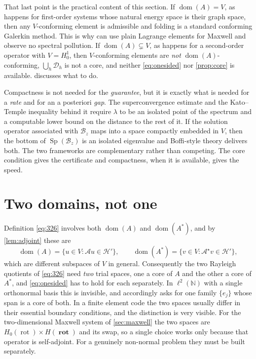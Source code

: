 \documentclass[11pt,a4paper]{article}
\theoremstyle{plain}
\newcommand{\N}{\mathbb{N}}
\newcommand{\Hb}{\mathcal{H}}
\newcommand{\Vb}{V}
\newcommand{\Aop}{\mathcal{A}}
\newcommand{\Bop}{\mathcal{B}}
\newcommand{\Dop}{\mathcal{D}}
\DeclareMathOperator{\dom}{dom}
\DeclareMathOperator{\Sp}{Sp}
\DeclareMathOperator{\rot}{rot}
\DeclareMathOperator{\Rot}{\mathbf{rot}}
\newcommand{\adj}{\star}                 %
\begin{document}
That last point is the practical content of this section.  If $\dom(A) = \Vb$,
as happens for first-order systems whose natural energy space is their graph
space, then any $\Vb$-conforming element is admissible and folding is a standard
conforming Galerkin method.  This is why \cite[\S3.4.4]{Colbrook2026} can use
plain Lagrange elements for Maxwell and observe no spectral pollution.  If
$\dom(A) \subsetneq \Vb$, as happens for a second-order operator with $\Vb =
H^1_0$, then $\Vb$-conforming elements are \emph{not} $\dom(A)$-conforming,
$\bigcup_h \Dop_h$ is not a core, and neither \cref{eq:onesided} nor
\cref{prop:core} is available.   discusses what to do.

\begin{remark}
  \label{rem:whereboffi}
  Compactness is not needed for the \emph{guarantee}, but it is exactly what is
  needed for a \emph{rate} and for an a posteriori \emph{gap}.  The
  superconvergence estimate \cite[Proposition~3.3.12, p.~107]{Colbrook2026} and
  the Kato--Temple inequality \cite[Theorem~3.3.11]{Colbrook2026} behind it
  require $\lambda$ to be an isolated point of the spectrum and a computable
  lower bound on the distance to the rest of it.  If the solution operator
  associated with $\Bop_z$ maps into a space compactly embedded in $\Vb$, then
  the bottom of $\Sp(\Bop_z)$ is an isolated eigenvalue and Boffi-style theory
  \cite{Boffi2010,BoffiBrezziFortin2013} delivers both.  The two frameworks are
  complementary rather than competing.  The core condition gives the certificate
  and compactness, when it is available, gives the speed.
\end{remark}

\section{Two domains, not one}
\label{sec:twodomains}

Definition \cref{eq:326} involves both $\dom(A)$ and $\dom(A^*)$, and by
\cref{lem:adjoint} these are
\begin{equation}
  \label{eq:twodomains}
  \dom(A) = \{u \in \Vb : \Aop u \in \Hb'\},
  \qquad
  \dom(A^*) = \{v \in \Vb : \Aop^{\adj} v \in \Hb'\},
\end{equation}
which are different subspaces of $\Vb$ in general.  Consequently the two
Rayleigh quotients of \cref{eq:326} need \emph{two} trial spaces, one a core of
$A$ and the other a core of $A^*$, and \cref{eq:onesided} has to hold for each
separately.  In $\ell^2(\N)$ with a single orthonormal basis this is invisible,
and \cite[Algorithm~3.4]{Colbrook2026} accordingly asks for one family $\{e_j\}$
whose span is a core of both.  In a finite element code the two spaces usually
differ in their essential boundary conditions, and the distinction is very
visible.  For the two-dimensional Maxwell system of \cref{sec:maxwell} the two
spaces are $H_0(\rot) \times H(\Rot)$ and its swap, so a single choice works
only because that operator is self-adjoint.  For a genuinely non-normal problem
they must be built separately.
\end{document}
